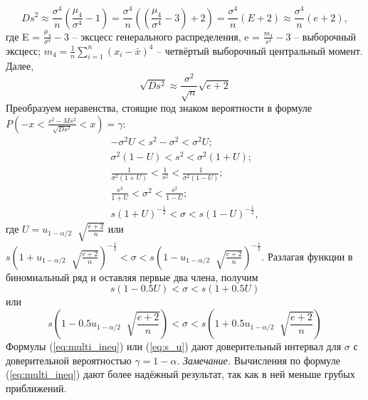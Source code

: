 \documentclass[main.tex]{subfiles}
\begin{document}
\begin{equation}
	D s^{2} \approx \frac{\sigma^{4}}{n}(\frac{\mu_{4}}{\sigma^{4}} - 1) = 
	\frac{\sigma^{4}}{n}((\frac{\mu_{4}}{\sigma^{4}} - 3) + 2) = \frac{\sigma^{4}}{n}(E + 2) \approx \frac{\sigma^{4}}{n}(e + 2),
	\label{eq:Ds_2}
\end{equation}
где E = $\frac{\mu_{4}}{\sigma^{4}} - 3$ -- эксцесс генерального распределения, e = $\frac{m_{4}}{s^{4}} - 3$ -- выборочный эксцесс; $m_{4} = \frac{1}{n}\sum_{i =1}^{n}{(x_{i} - \bar{x})^{4}}$ -- четвёртый выборочный центральный момент. Далее,
\begin{equation}
	\sqrt{D s^{2}} \approx \frac{\sigma^{2}}{\sqrt{n}}\sqrt{e + 2}
	\label{eq:sqrt_Ds}
\end{equation}
Преобразуем неравенства, стоящие под знаком вероятности в формуле
\newline
$P\left(-x < \frac{s^{2}-Ms^{2}}{\sqrt{D s^{2}}} < x\right) = \gamma$:
\begin{equation}
	\begin{split}
		-\sigma^{2}U < s^{2} -\sigma^{2} < \sigma^{2}U; \\
		\sigma^{2}(1-U) < s^{2} < \sigma^{2}(1 + U); \\
		\frac{1}{\sigma^{2}(1 + U)} < \frac{1}{s^{2}} < \frac{1}{\sigma^{2}(1-U)};\\
		\frac{s^{2}}{1 + U} < \sigma^{2} < \frac{s^{2}}{1 - U};\\
		s(1 + U)^{-\frac{1}{2}} < \sigma < s(1-U)^{-\frac{1}{2}},
	\end{split}
	\label{eq:multi_ineq}
\end{equation}
где $U = u_{1-\alpha/2}︀\sqrt{\frac{e + 2}{n}}$ или
\newline
$s(1 +  u_{1-\alpha/2}︀\sqrt{\frac{e + 2}{n}})^{-\frac{1}{2}} <\sigma < s(1-u_{1-\alpha/2}︀\sqrt{\frac{e + 2}{n}})^{-\frac{1}{2}}$.
\newline
Разлагая функции в биномиальный ряд и оставляя первые два члена, получим
\begin{equation}
	s(1-0.5U) < \sigma < s(1 + 0.5U)
	\label{eq:s_U}
\end{equation}
или
\begin{equation}
	s(1-0.5u_{1-\alpha/2}︀\sqrt{\frac{e + 2}{n}}) < \sigma < s(1 + 0.5 u_{1-\alpha/2}︀\sqrt{\frac{e + 2}{n}})
	\label{eq:s_u}
\end{equation}
Формулы (\ref{eq:multi_ineq}) или (\ref{eq:s_u}) дают доверительный интервал для $\sigma$ с доверительной вероятностью $\gamma = 1-\alpha$. 
\newline
\textit{Замечание.} Вычисления по формуле (\ref{eq:multi_ineq}) дают более надёжный результат, так как в ней меньше грубых приближений.

\newpage
\end{document}

